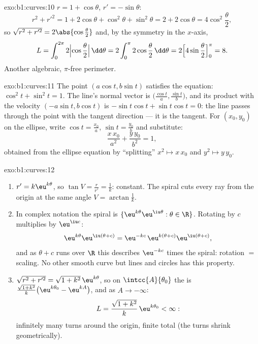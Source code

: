 \begin{solution}{exo:b1:curves:10}
$r = 1 + \cos\theta$, $r' = -\sin\theta$:
\[
r^2 + r'^2 = 1 + 2\cos\theta + \cos^2\theta + \sin^2\theta
= 2 + 2\cos\theta = 4\cos^2\frac\theta2 ,
\]
so $\sqrt{r^2 + r'^2} = 2\abs{\cos\frac\theta2}$ and, by the
symmetry in the $x$-axis,
\[
L = \int_0^{2\pi} 2\Bigl|\cos\frac\theta2\Bigr|\,\dd\theta
= 2\int_0^{\pi} 2\cos\frac\theta2\,\dd\theta
= 2\Bigl[4\sin\frac\theta2\Bigr]_0^{\pi} = 8 .
\]
Another algebraic, $\pi$-free perimeter.
\end{solution}

\begin{solution}{exo:b1:curves:11}
The point $(a\cos t, b\sin t)$ satisfies the equation:
$\cos^2 t + \sin^2 t = 1$. The line's normal vector is
$\bigl(\frac{\cos t}a, \frac{\sin t}b\bigr)$, and its product
with the velocity $(-a\sin t, b\cos t)$ is $-\sin t\cos t +
\sin t\cos t = 0$: the line passes through the point with the
tangent direction --- it is the tangent. For $(x_0, y_0)$ on the
ellipse, write $\cos t = \frac{x_0}a$, $\sin t = \frac{y_0}b$ and
substitute:
\[
\frac{x\,x_0}{a^2} + \frac{y\,y_0}{b^2} = 1 ,
\]
obtained from the ellipse equation by ``splitting'' $x^2 \mapsto
x\,x_0$ and $y^2 \mapsto y\,y_0$.
\end{solution}

\begin{solution}{exo:b1:curves:12}
\begin{enumerate}
  \item $r' = k\eu^{k\theta}$, so $\tan V = \frac{r}{r'} =
        \frac1k$: constant. The spiral cuts every ray from the
        origin at the same angle $V = \arctan\frac1k$.
  \item In complex notation the spiral is $\{\eu^{k\theta}
        \eu^{\iu\theta} : \theta \in \R\}$. Rotating by $c$
        multiplies by $\eu^{\iu c}$:
        \[
        \eu^{k\theta}\eu^{\iu(\theta + c)}
        = \eu^{-kc}\,\eu^{k(\theta + c)}\eu^{\iu(\theta+c)} ,
        \]
        and as $\theta + c$ runs over $\R$ this describes
        $\eu^{-kc}$ times the spiral: rotation $=$ scaling. No
        other smooth curve but lines and circles has this
        property.
  \item $\sqrt{r^2 + r'^2} = \sqrt{1 + k^2}\,\eu^{k\theta}$, so
        on $\intcc{A}{\theta_0}$ the  is
        $\frac{\sqrt{1+k^2}}{k}\bigl(\eu^{k\theta_0} -
        \eu^{kA}\bigr)$, and as $A \to -\infty$:
        \[
        L = \frac{\sqrt{1 + k^2}}{k}\,\eu^{k\theta_0} < \infty :
        \]
        infinitely many turns around the origin, finite total
         (the turns shrink geometrically).
\end{enumerate}
\end{solution}

